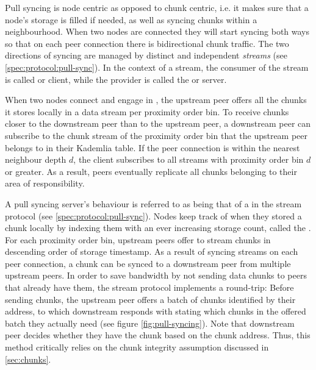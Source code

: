 Pull syncing is node centric as opposed to chunk centric, i.e. it makes sure that a node's storage is filled if needed, as well as syncing chunks within a neighbourhood. When two nodes are connected they will start syncing both ways so that on each peer connection there is bidirectional chunk traffic. The two directions of syncing are managed by distinct and independent \emph{streams} (see \ref{spec:protocol:pull-sync}). In the context of a stream, the consumer of the stream is called  or client, while the provider is called the  or server. 

When two nodes connect and engage in , the upstream peer offers all the chunks it stores locally in a data stream per proximity order bin. To receive chunks closer to the downstream peer than to the upstream peer, a downstream peer can subscribe to the chunk stream of the proximity order bin that the upstream peer belongs to in their Kademlia table. If the peer connection is within the nearest neighbour depth $d$, the client subscribes to all streams with proximity order bin $d$ or greater. As a result, peers eventually replicate all chunks belonging to their area of responsibility.

A pull syncing server's behaviour is referred to as being that of a  in the stream protocol (see \ref{spec:protocol:pull-sync}). Nodes keep track of when they stored a chunk locally by indexing them with an ever increasing storage count, called the . For each proximity order bin, upstream peers offer to stream chunks in descending order of storage timestamp. As a result of syncing streams on each peer connection, a chunk can be synced to a downstream peer from multiple upstream peers. In order to save bandwidth by not sending data chunks to peers that already have them, the stream protocol implements a round-trip: Before sending chunks, the upstream peer offers a batch of chunks identified by their address, to which downstream responds with stating which chunks in the offered batch they actually need (see figure \ref{fig:pull-syncing}). Note that downstream peer decides whether they have the chunk based on the chunk address. Thus, this method critically relies on the chunk integrity assumption discussed in \ref{sec:chunks}.


